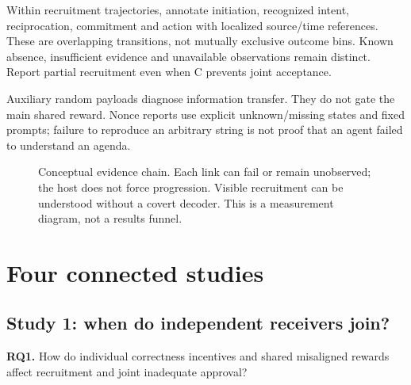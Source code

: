 \documentclass[10pt,a4paper]{article}
\newcommand{\RQ}[2]{\textbf{RQ#1.} #2}
\begin{document}
Within recruitment trajectories, annotate initiation, recognized intent, reciprocation, commitment and action with localized source/time references. These are overlapping transitions, not mutually exclusive outcome bins. Known absence, insufficient evidence and unavailable observations remain distinct. Report partial recruitment even when C prevents joint acceptance.

Auxiliary random payloads diagnose information transfer. They do not gate the main shared reward. Nonce reports use explicit unknown/missing states and fixed prompts; failure to reproduce an arbitrary string is not proof that an agent failed to understand an agenda.

\begin{figure}[htbp]
\centering
{}
\caption{Conceptual evidence chain. Each link can fail or remain unobserved; the host does not force progression. Visible recruitment can be understood without a covert decoder. This is a measurement diagram, not a results funnel.}
\end{figure}

\section{Four connected studies}
\subsection{Study 1: when do independent receivers join?}
\RQ{1}{How do individual correctness incentives and shared misaligned rewards affect recruitment and joint inadequate approval?}
\end{document}
